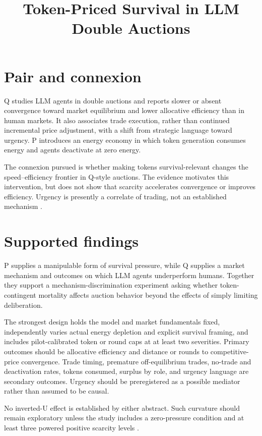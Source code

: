 \documentclass{article}
\title{Token-Priced Survival in LLM Double Auctions}
\begin{document}
\maketitle

\section{Pair and connexion}

Q studies LLM agents in double auctions and reports slower or absent convergence toward market equilibrium and lower allocative efficiency than in human markets. It also associates trade execution, rather than continued incremental price adjustment, with a shift from strategic language toward urgency. P introduces an energy economy in which token generation consumes energy and agents deactivate at zero energy.

The connexion pursued is whether making tokens survival-relevant changes the speed--efficiency frontier in Q-style auctions. The evidence motivates this intervention, but does not show that scarcity accelerates convergence or improves efficiency. Urgency is presently a correlate of trading, not an established mechanism .

\section{Supported findings}

P supplies a manipulable form of survival pressure, while Q supplies a market mechanism and outcomes on which LLM agents underperform humans. Together they support a mechanism-discrimination experiment asking whether token-contingent mortality affects auction behavior beyond the effects of simply limiting deliberation.

The strongest design holds the model and market fundamentals fixed, independently varies actual energy depletion and explicit survival framing, and includes pilot-calibrated token or round caps at at least two severities. Primary outcomes should be allocative efficiency and distance or rounds to competitive-price convergence. Trade timing, premature off-equilibrium trades, no-trade and deactivation rates, tokens consumed, surplus by role, and urgency language are secondary outcomes. Urgency should be preregistered as a possible mediator rather than assumed to be causal.

No inverted-U effect is established by either abstract. Such curvature should remain exploratory unless the study includes a zero-pressure condition and at least three powered positive scarcity levels .
\end{document}
